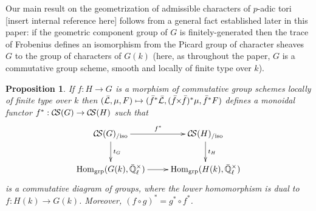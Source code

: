 \documentclass[11pt]{amsart}
\theoremstyle{plain}
\newtheorem{proposition}[theorem]{Proposition}
\theoremstyle{definition}
\theoremstyle{remark}
\newcommand{\EE}{\mathbb{\bar Q}_\ell}
\newcommand{\Fq}{k}
\DeclareMathOperator{\Hom}{Hom}
\newcommand{\gcs}[1]{{\mathcal{\bar #1}}}
\newcommand{\CS}{{\mathcal{C\hskip-1.8pt S}}}
\newcommand{\tightertimes}{\hskip-3pt\times\hskip-3pt}
\begin{document}
Our main result on the geometrization of admissible characters of
$p$-adic tori [insert internal reference here] follows from a general
fact established later in this paper: if the geometric component group
of $G$ is finitely-generated then the trace of Frobenius defines an
isomorphism from the Picard group of character sheaves $G$ to the
group of characters of $G(\Fq)$ (here, as throughout the paper, $G$ is
a commutative group scheme, smooth and locally of finite type over $\Fq$).


\begin{proposition}\label{prop:pullback}
  If $f : H\to G$ is a morphism of commutative group schemes locally of finite type over $\Fq$ then
  $(\gcs{L},\mu,F) \mapsto ({\bar f}^*\gcs{L},({\bar f}\tightertimes{\bar f})^*\mu,{\bar f}^*F)$
  defines a monoidal functor $f^* : \CS(G) \to \CS(H)$ such that
  \[
  \xymatrix{
  \CS(G)_{/\text{iso}} \ar[r]^{f^*} \ar[d]^{t_{G}} &  \ar[d]^{t_{H}} \CS(H)_{/\text{iso}}\\
  \Hom_\text{grp}(G(\Fq),\EE^\times) \ar[r] & \Hom_\text{grp}(H(\Fq),\EE^\times)
  }
  \]
  is a commutative diagram of groups, where the lower homomorphism is
  dual to $f : H(\Fq)\to G(\Fq)$.  Moreover, $(f\circ g)^* = g^* \circ f^*$.
\end{proposition}
\end{document}
